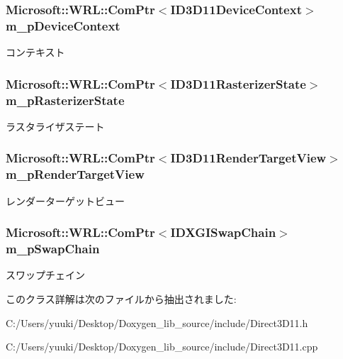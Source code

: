 \subsubsection[{\texorpdfstring{m\+\_\+p\+Device\+Context}{m_pDeviceContext}}]{\setlength{\rightskip}{0pt plus 5cm}Microsoft\+::\+W\+R\+L\+::\+Com\+Ptr$<$I\+D3\+D11\+Device\+Context$>$ m\+\_\+p\+Device\+Context\hspace{0.3cm}{\ttfamily [private]}}\hypertarget{class_d3_d11_1_1_direct3_d11_a96130435411c63bd3fbe61b3ea72cd1e}{}\label{class_d3_d11_1_1_direct3_d11_a96130435411c63bd3fbe61b3ea72cd1e}
コンテキスト 
\subsubsection[{\texorpdfstring{m\+\_\+p\+Rasterizer\+State}{m_pRasterizerState}}]{\setlength{\rightskip}{0pt plus 5cm}Microsoft\+::\+W\+R\+L\+::\+Com\+Ptr$<$I\+D3\+D11\+Rasterizer\+State$>$ m\+\_\+p\+Rasterizer\+State\hspace{0.3cm}{\ttfamily [private]}}\hypertarget{class_d3_d11_1_1_direct3_d11_a5332afbf9cb9c36f53b0c05219ed4ac0}{}\label{class_d3_d11_1_1_direct3_d11_a5332afbf9cb9c36f53b0c05219ed4ac0}
ラスタライザステート 
\subsubsection[{\texorpdfstring{m\+\_\+p\+Render\+Target\+View}{m_pRenderTargetView}}]{\setlength{\rightskip}{0pt plus 5cm}Microsoft\+::\+W\+R\+L\+::\+Com\+Ptr$<$I\+D3\+D11\+Render\+Target\+View$>$ m\+\_\+p\+Render\+Target\+View\hspace{0.3cm}{\ttfamily [private]}}\hypertarget{class_d3_d11_1_1_direct3_d11_a43a0f700bf837a8b14463a295aa78a0d}{}\label{class_d3_d11_1_1_direct3_d11_a43a0f700bf837a8b14463a295aa78a0d}
レンダーターゲットビュー 
\subsubsection[{\texorpdfstring{m\+\_\+p\+Swap\+Chain}{m_pSwapChain}}]{\setlength{\rightskip}{0pt plus 5cm}Microsoft\+::\+W\+R\+L\+::\+Com\+Ptr$<$I\+D\+X\+G\+I\+Swap\+Chain$>$ m\+\_\+p\+Swap\+Chain\hspace{0.3cm}{\ttfamily [private]}}\hypertarget{class_d3_d11_1_1_direct3_d11_ac65621ae00fb1dc6918fad9de8777982}{}\label{class_d3_d11_1_1_direct3_d11_ac65621ae00fb1dc6918fad9de8777982}
スワップチェイン 

このクラス詳解は次のファイルから抽出されました\+:\begin{DoxyCompactItemize}
\item 
C\+:/\+Users/yuuki/\+Desktop/\+Doxygen\+\_\+lib\+\_\+source/include/Direct3\+D11.\+h\item 
C\+:/\+Users/yuuki/\+Desktop/\+Doxygen\+\_\+lib\+\_\+source/include/Direct3\+D11.\+cpp\end{DoxyCompactItemize}
